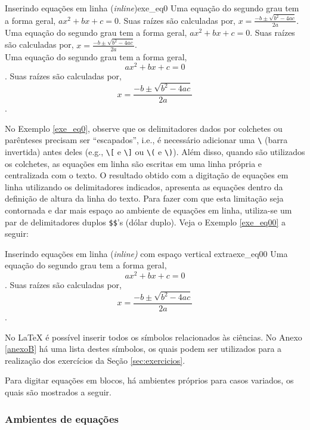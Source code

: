 \begin{texexptitled}[breakable,center lower,enhanced,middle=2mm]{Inserindo equações em linha (\textit{inline})}{exe_eq0}
Uma equação do segundo grau tem a forma geral, $ax^2 + bx + c =0$. Suas raízes são calculadas por, $x = \frac{-b \pm \sqrt{b^2 - 4ac}}{2a}$.
\\
Uma equação do segundo grau tem a forma geral, \(ax^2 + bx + c =0\). Suas raízes são calculadas por, \(x = \frac{-b \pm \sqrt{b^2 - 4ac}}{2a}\).
\\
Uma equação do segundo grau tem a forma geral, \[ax^2 + bx + c =0\]. Suas raízes são calculadas por, \[x = \frac{-b \pm \sqrt{b^2 - 4ac}}{2a}\].
\end{texexptitled}

No Exemplo \ref{exe_eq0}, observe que os delimitadores dados por colchetes ou parênteses precisam ser ``escapados'', i.e., é necessário adicionar uma \verb|\| (barra invertida) antes deles (e.g., \verb|\[| e \verb|\]| ou \verb|\(| e \verb|\)|). Além disso, quando são utilizados os colchetes, as equações em linha são escritas em uma linha própria e centralizada com o texto. O resultado obtido com a digitação de equações em linha utilizando os delimitadores indicados, apresenta as equações dentro da definição de altura da linha do texto. Para fazer com que esta limitação seja contornada e dar mais espaço ao ambiente de equações em linha, utiliza-se um par de delimitadores duplos \verb|$$|'s (dólar duplo). Veja o Exemplo \ref{exe_eq00} a seguir:

\begin{texexptitled}[breakable,center lower,enhanced,middle=2mm]{Inserindo equações em linha (\textit{inline)} com espaço vertical extra}{exe_eq00}
Uma equação do segundo grau tem a forma geral, $$ax^2 + bx + c =0$$. Suas raízes são calculadas por, $$x = \frac{-b \pm \sqrt{b^2 - 4ac}}{2a}$$.
\end{texexptitled}

No \LaTeX{} é possível inserir todos os símbolos relacionados às ciências. No Anexo \ref{anexoB} há uma lista destes símbolos, os quais podem ser utilizados para a realização dos exercícios da Seção \ref{sec:exercicios}.

Para digitar equações em blocos, há ambientes próprios para casos variados, os quais são mostrados a seguir.

\subsubsection*{Ambientes de equações}
\label{sec:amb_eqs}

